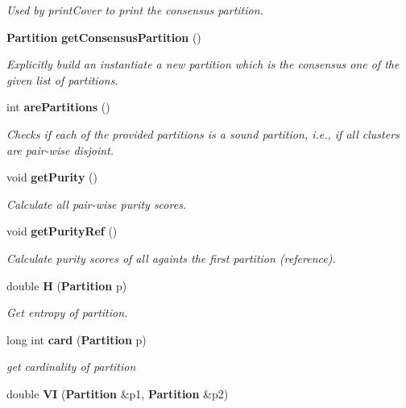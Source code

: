 \begin{CompactItemize}
\begin{CompactList}\small\item\em Used by print\-Cover to print the consensus partition. \item\end{CompactList}\item 
{\bf Partition} {\bf get\-Consensus\-Partition} ()
\begin{CompactList}\small\item\em Explicitly build an instantiate a new partition which is the consensus one of the given list of partitions. \item\end{CompactList}\item 
int {\bf are\-Partitions} ()\label{classPartitionStats_a7}

\begin{CompactList}\small\item\em Checks if each of the provided partitions is a sound partition, i.e., if all clusters are pair-wise disjoint. \item\end{CompactList}\item 
void {\bf get\-Purity} ()\label{classPartitionStats_a8}

\begin{CompactList}\small\item\em Calculate all pair-wise purity scores. \item\end{CompactList}\item 
void {\bf get\-Purity\-Ref} ()\label{classPartitionStats_a9}

\begin{CompactList}\small\item\em Calculate purity scores of all againts the first partition (reference). \item\end{CompactList}\item 
double {\bf H} ({\bf Partition} p)\label{classPartitionStats_a10}

\begin{CompactList}\small\item\em Get entropy of partition. \item\end{CompactList}\item 
long int {\bf card} ({\bf Partition} p)\label{classPartitionStats_a11}

\begin{CompactList}\small\item\em get cardinality of partition \item\end{CompactList}\item 
double {\bf VI} ({\bf Partition} \&p1, {\bf Partition} \&p2)\label{classPartitionStats_a12}


\end{CompactItemize}
